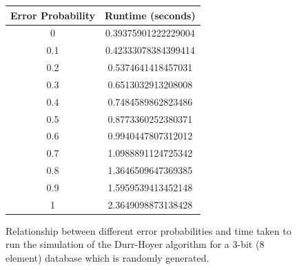 \documentclass{article}[11pt]
\begin{document}
\begin{figure}[H]
\centering
\begin{tabular}{||c|c||}
\hline
Error Probability & Runtime (seconds)\\
\hline
0 & 0.39375901222229004\\
0.1 & 0.42333078384399414\\
0.2 & 0.5374641418457031\\
0.3 & 0.6513032913208008\\
0.4 & 0.7484589862823486\\
0.5 & 0.8773360252380371\\
0.6 & 0.9940447807312012\\
0.7 & 1.0988891124725342\\
0.8 & 1.3646509647369385\\
0.9 & 1.5959539413452148\\
1 & 2.3649098873138428\\
\hline
\end{tabular}
\caption{Relationship between different error probabilities and time taken to run the simulation of the Durr-Hoyer algorithm for a 3-bit (8 element) database which is randomly generated.}
\end{figure}
\end{document}
